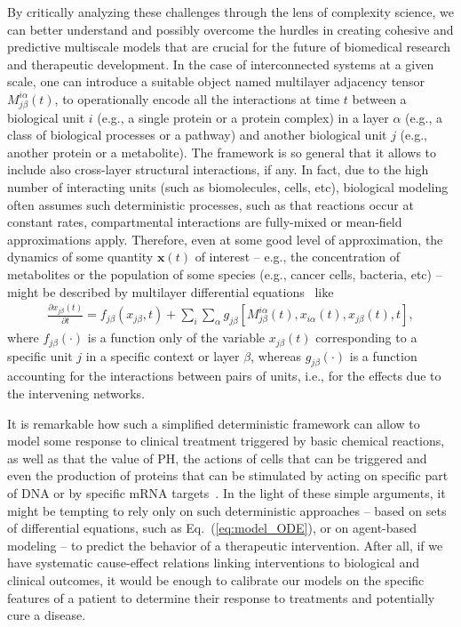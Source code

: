\documentclass[12pt]{article}
\renewcommand{\(}{\left(}
\renewcommand{\)}{\right)}
\renewcommand{\[}{\left[}
\renewcommand{\]}{\right]}
\begin{document}
By critically analyzing these challenges through the lens of complexity science, we can better understand and possibly overcome the hurdles in creating cohesive and predictive multiscale models that are crucial for the future of biomedical research and therapeutic development. In the case of interconnected systems at a given scale, one can introduce a suitable object named multilayer adjacency tensor $M^{i\alpha}_{j\beta}(t)$, to operationally encode all the interactions at time $t$ between a biological unit $i$ (e.g., a single protein or a protein complex) in a layer $\alpha$ (e.g., a class of biological processes or a pathway) and another biological unit $j$ (e.g., another protein or a metabolite). The framework is so general that it allows to include also cross-layer structural interactions, if any. In fact, due to the high number of interacting units (such as biomolecules, cells, etc), biological modeling often assumes such deterministic processes, such as that reactions occur at constant rates, compartmental interactions are fully-mixed or mean-field approximations apply. Therefore, even at some good level of approximation, the dynamics of some quantity $\mathbf{x}(t)$ of interest -- e.g., the concentration of metabolites or the population of some species (e.g., cancer cells, bacteria, etc) -- might be described by multilayer differential equations~\cite{de2016physics,de2023more} like
\begin{eqnarray}
\label{eq:model_ODE}
\frac{\partial x_{j\beta}(t)}{\partial t} = f_{j\beta}(x_{j\beta},t) + \sum_{i}\sum_{\alpha} g_{j\beta}\left[M^{i\alpha}_{j\beta}(t), x_{i\alpha}(t), x_{j\beta}(t) ,t\right],
\end{eqnarray}
where $f_{j\beta}(\cdot)$ is a function only of the variable $x_{j\beta}(t)$ corresponding to a specific unit $j$ in a specific context or layer $\beta$, whereas $g_{j\beta}(\cdot)$ is a function accounting for the interactions between pairs of units, i.e., for the effects due to the intervening networks.

It is remarkable how such a simplified deterministic framework can allow to model some response to clinical treatment triggered by basic chemical reactions, as well as that the value of PH, the actions of cells that can be triggered and even the production of proteins that can be stimulated by acting on specific part of DNA or by specific mRNA targets~\cite{kowalski2019delivering,rohner2022unlocking}. In the light of these simple arguments, it might be tempting to rely only on such deterministic approaches -- based on sets of differential equations, such as Eq.~(\ref{eq:model_ODE}), or on agent-based modeling -- to predict the behavior of a therapeutic intervention. After all, if we have systematic cause-effect relations linking interventions to biological and clinical outcomes, it would be enough to calibrate our models on the specific features of a patient to determine their response to treatments and potentially cure a disease. 
\end{document}
